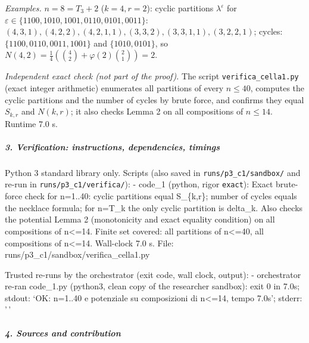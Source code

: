 \documentclass[11pt,a4paper]{article}
\begin{document}
\emph{Examples.} \(n=8=T_3+2\) (\(k=4,r=2\)): cyclic partitions
\(\lambda^\varepsilon\) for
\(\varepsilon\in\{1100,1010,1001,0110,0101,0011\}\):
\((4,3,1),(4,2,2),(4,2,1,1),(3,3,2),(3,3,1,1),(3,2,2,1)\); cycles:
\(\{1100,0110,0011,1001\}\) and \(\{1010,0101\}\), so
\(N(4,2)=\frac14(\binom42+\varphi(2)\binom21)=2\).

\emph{Independent exact check (not part of the proof).} The script
\texttt{verifica\_cella1.py} (exact integer arithmetic) enumerates all
partitions of every \(n\le40\), computes the cyclic partitions and the
number of cycles by brute force, and confirms they equal \(S_{k,r}\) and
\(N(k,r)\); it also checks Lemma 2 on all compositions of \(n\le14\).
Runtime 7.0 s.

\subparagraph{3. Verification: instructions, dependencies,
timings}\label{verification-instructions-dependencies-timings}

Python 3 standard library only. Scripts (also saved in
\texttt{runs/p3\_c1/sandbox/} and re-run in
\texttt{runs/p3\_c1/verifica/}): - code\_1 (python, rigor
\texttt{exact}): Exact brute-force check for n=1..40: cyclic partitions
equal S\_\{k,r\}; number of cycles equals the necklace formula; for
n=T\_k the only cyclic partition is delta\_k. Also checks the potential
Lemma 2 (monotonicity and exact equality condition) on all compositions
of n\textless=14. Finite set covered: all partitions of n\textless=40,
all compositions of n\textless=14. Wall-clock 7.0 s. File:
runs/p3\_c1/sandbox/verifica\_cella1.py

Trusted re-runs by the orchestrator (exit code, wall clock, output): -
orchestrator re-ran code\_1.py (python3, clean copy of the researcher
sandbox): exit 0 in 7.0s; stdout: `OK: n=1..40 e potenziale su
composizioni di n\textless=14, tempo 7.0s'; stderr: '\,'

\subparagraph{4. Sources and
contribution}\label{sources-and-contribution}
\end{document}
